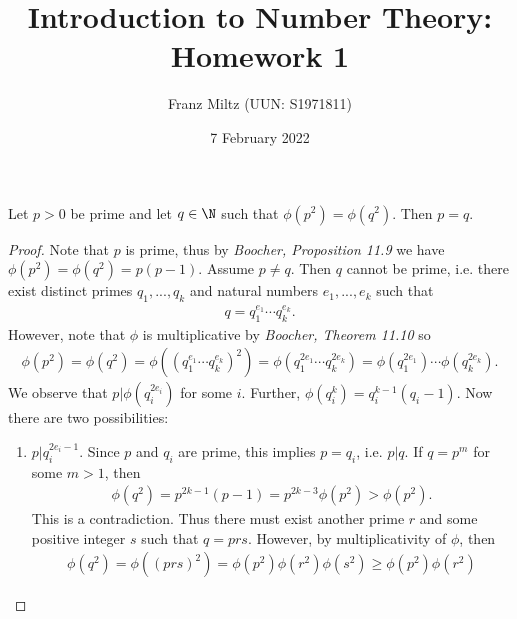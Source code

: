 \documentclass{article}
\begin{document}
\title{Introduction to Number Theory: Homework 1}
\author{Franz Miltz (UUN: S1971811)}
\date{7 February 2022}
\maketitle

\begin{claim*}[1]
   Let $p>0$ be prime and let $q\in\N$ such that $\phi\left(p^2\right) = \phi\left(q^2\right)$.
   Then $p=q$.
   \begin{proof}
      Note that $p$ is prime, thus by \emph{Boocher, Proposition 11.9} we
      have $\phi\left(p^2\right)=\phi\left(q^2\right)=p(p-1)$. Assume $p\not= q$.
      Then $q$ cannot be prime, i.e. there exist distinct primes $q_1,...,q_k$ and natural
      numbers $e_1,...,e_k$ such that
      \begin{align*}
         q = q_1^{e_1}\cdots q_k^{e_k}.
      \end{align*}
      However, note that $\phi$ is multiplicative by \emph{Boocher, Theorem 11.10}
      so
      \begin{align}
         \label{factorisation}
         \phi(p^2)
         =\phi(q^2)
         =\phi\left(\left(q_1^{e_1}\cdots q_k^{e_k}\right)^2\right)
         =\phi\left(q_1^{2e_1}\cdots q_k^{2e_k}\right)
         =\phi\left(q_1^{2e_1}\right)\cdots\phi\left(q_k^{2e_k}\right).
      \end{align}
      We observe that $p|\phi\left(q_i^{2e_i}\right)$ for some $i$.
      Further, $\phi\left(q_i^k\right)=q_i^{k-1}(q_i-1)$. Now there are two possibilities:
      \begin{enumerate}
         \item $p|q_i^{2e_i-1}$. Since $p$ and $q_i$ are prime, this implies
               $p=q_i$, i.e. $p|q$. If $q=p^m$ for some $m>1$, then \begin{align*}
                  \phi\left(q^2\right)=p^{2k-1}(p-1)=p^{2k-3}\phi\left(p^2\right)
                  >\phi\left(p^2\right).
               \end{align*}
               This is a contradiction. Thus there must exist another prime $r$ and some 
               positive integer $s$ such that $q=prs$. However, by multiplicativity of $\phi$,
               then
               \begin{align*}
                  \phi\left(q^2\right)
                  =    \phi\left((prs)^2\right)
                  =    \phi\left(p^2\right)\phi\left(r^2\right)\phi(s^2)
                  \geq \phi\left(p^2\right)\phi\left(r^2\right)

\end{align*}
\end{enumerate}
\end{proof}
\end{claim*}
\end{document}

